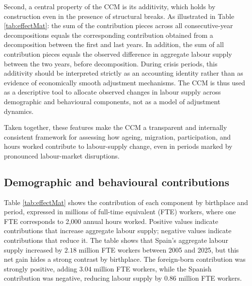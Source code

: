 \vspace{0.7em}\par
Second, a central property of the CCM is its additivity, which holds by construction even in the presence of structural breaks. As illustrated in Table \ref{tab:effectMat}: the sum of the contribution pieces across all consecutive-year decompositions equals the corresponding contribution obtained from a decomposition between the first and last years. In addition, the sum of all contribution pieces equals the observed difference in aggregate labour supply between the two years, before decomposition. During crisis periods, this additivity should be interpreted strictly as an accounting identity rather than as evidence of economically smooth adjustment mechanisms. The CCM is thus used as a descriptive tool to allocate observed changes in labour supply across demographic and behavioural components, not as a model of adjustment dynamics.

\vspace{0.7em}\par
Taken together, these features make the CCM a transparent and internally consistent framework for assessing how ageing, migration, participation, and hours worked contribute to labour-supply change, even in periods marked by pronounced labour-market disruptions.


\subsection{Demographic and behavioural contributions}

Table \ref{tab:effectMat} shows the contribution of each component by birthplace and period, expressed in millions of full-time equivalent (FTE) workers, where one FTE corresponds to 2,000 annual hours worked. Positive values indicate contributions that increase aggregate labour supply; negative values indicate contributions that reduce it. The table shows that Spain's aggregate labour supply increased by \(2.18\) million FTE workers between 2005 and 2025, but this net gain hides a strong contrast by birthplace. The foreign-born contribution was strongly positive, adding \(3.04\) million FTE workers, while the Spanish contribution was negative, reducing labour supply by \(0.86\) million FTE workers.


\begin{table}[H]%
  \caption{Decomposition of changes in aggregate labour supply by birthplace, component, and period, Spain.}

  \label{tab:effectMat}%
  \begin{center}
    \caption*{\small Note: Values are expressed in millions of full-time equivalent (FTE) workers.}
  \end{center}
\end{table}%



